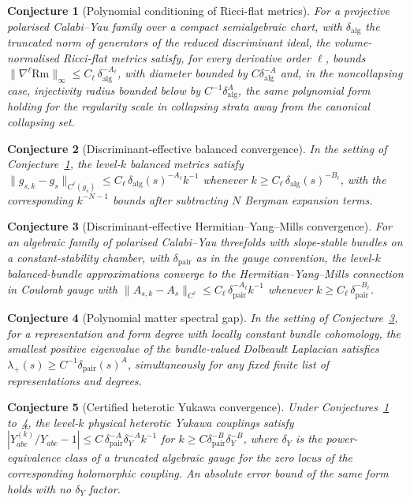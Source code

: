 \documentclass[11pt]{article}
\newtheorem{conjecture}{Conjecture}
\theoremstyle{definition}
\begin{document}
\begin{conjecture}[Polynomial conditioning of Ricci-flat metrics]\label{ad13}
For a projective polarised Calabi--Yau family over a compact semialgebraic chart, with $\delta_{\mathrm{alg}}$ the truncated norm of generators of the reduced discriminant ideal, the volume-normalised Ricci-flat metrics satisfy, for every derivative order $\ell$, bounds $\|\nabla^\ell\mathrm{Rm}\|_\infty\le C_\ell\,\delta_{\mathrm{alg}}^{-A_\ell}$, with diameter bounded by $C\delta_{\mathrm{alg}}^{-A}$ and, in the noncollapsing case, injectivity radius bounded below by $C^{-1}\delta_{\mathrm{alg}}^{A}$, the same polynomial form holding for the regularity scale in collapsing strata away from the canonical collapsing set.
\end{conjecture}

\begin{conjecture}[Discriminant-effective balanced convergence]\label{ad14}
In the setting of Conjecture~\ref{ad13}, the level-$k$ balanced metrics satisfy $\|g_{s,k}-g_s\|_{C^\ell(g_s)}\le C_\ell\,\delta_{\mathrm{alg}}(s)^{-A_\ell}k^{-1}$ whenever $k\ge C_\ell\,\delta_{\mathrm{alg}}(s)^{-B_\ell}$, with the corresponding $k^{-N-1}$ bounds after subtracting $N$ Bergman expansion terms.
\end{conjecture}

\begin{conjecture}[Discriminant-effective Hermitian--Yang--Mills convergence]\label{ad15}
For an algebraic family of polarised Calabi--Yau threefolds with slope-stable bundles on a constant-stability chamber, with $\delta_{\mathrm{pair}}$ as in the gauge convention, the level-$k$ balanced-bundle approximations converge to the Hermitian--Yang--Mills connection in Coulomb gauge with $\|A_{s,k}-A_s\|_{C^\ell}\le C_\ell\,\delta_{\mathrm{pair}}^{-A_\ell}k^{-1}$ whenever $k\ge C_\ell\,\delta_{\mathrm{pair}}^{-B_\ell}$.
\end{conjecture}

\begin{conjecture}[Polynomial matter spectral gap]\label{ad16}
In the setting of Conjecture~\ref{ad15}, for a representation and form degree with locally constant bundle cohomology, the smallest positive eigenvalue of the bundle-valued Dolbeault Laplacian satisfies $\lambda_+(s)\ge C^{-1}\delta_{\mathrm{pair}}(s)^{A}$, simultaneously for any fixed finite list of representations and degrees.
\end{conjecture}

\begin{conjecture}[Certified heterotic Yukawa convergence]\label{ad17}
Under Conjectures~\ref{ad13} to~\ref{ad16}, the level-$k$ physical heterotic Yukawa couplings satisfy $|Y^{(k)}_{abc}/Y_{abc}-1|\le C\,\delta_{\mathrm{pair}}^{-A}\delta_Y^{-A}k^{-1}$ for $k\ge C\delta_{\mathrm{pair}}^{-B}\delta_Y^{-B}$, where $\delta_Y$ is the power-equivalence class of a truncated algebraic gauge for the zero locus of the corresponding holomorphic coupling.  An absolute error bound of the same form holds with no $\delta_Y$ factor.
\end{conjecture}
\end{document}
